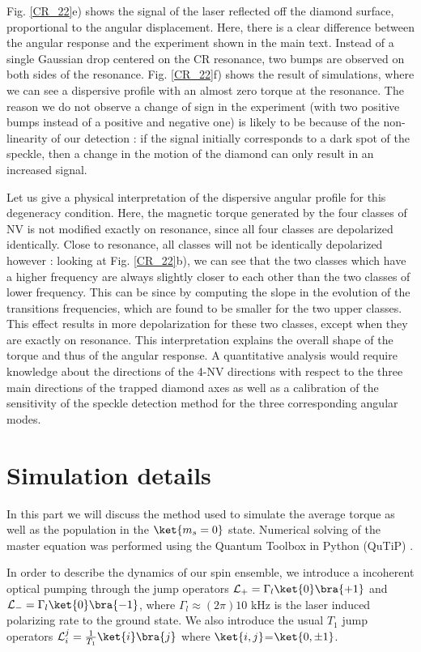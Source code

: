 \documentclass[preprintnumbers,amsmath,amssymb,onecolumn,12pt]{revtex4}
\begin{document}
Fig. \ref{CR_22}e) shows the signal of the laser reflected off the diamond surface, proportional to the angular displacement. Here, there is a clear difference between the angular response and the experiment shown in the main text. Instead of a single Gaussian drop centered on the CR resonance, two bumps are observed on both sides of the resonance. 
Fig. \ref{CR_22}f) shows the result of simulations, where we can see a dispersive profile with an almost zero torque at the resonance. 
The reason we do not observe a change of sign in the experiment (with two positive bumps instead of a positive and negative one) is likely to be because of the non-linearity of our detection : if the signal initially corresponds to a dark spot of the speckle, then a change in the motion of the diamond can only result in an increased signal. 

Let us give a physical interpretation of the dispersive angular profile for this degeneracy condition. 
Here, the magnetic torque generated by the four classes of NV is not modified exactly on resonance, since all four classes are depolarized identically. Close to resonance, all classes will not be identically depolarized however : looking at Fig. \ref{CR_22}b), we can see that the two classes which have a higher frequency are always slightly closer to each other than the two classes of lower frequency. This can be since by computing the slope in the evolution of the transitions frequencies, which are found to be smaller for the two upper classes. 
This effect results in more depolarization for these two classes, except when they are exactly on resonance. This interpretation explains the overall shape of the torque and thus of the angular response.
A quantitative analysis would require knowledge about the directions of the 4-NV directions with respect to the three main directions of the trapped diamond axes as well as a calibration of the sensitivity of the speckle detection method for the three corresponding angular modes. 

\section{Simulation details}
\label{Simu}
In this part we will discuss the method used to simulate the average torque as well as the population in the $\ket{m_s=0}$ state. Numerical solving of the master equation was performed using the Quantum Toolbox in Python (QuTiP) \citep{qutip1} \citep{qutip2}.

In order to describe the dynamics of our spin ensemble, we introduce a incoherent optical pumping through the jump operators $\mathcal{L}_+ = \Gamma_l \ket{0}\bra{+1} $ and $\mathcal{L}_- = \Gamma_l \ket{0}\bra{-1} $, where $\Gamma_l \approx (2\pi) 10$ kHz is the laser induced polarizing rate to the ground state.
We also introduce the usual $T_1$ jump operators $\mathcal{L}_i^j= \frac{1}{T_1}\ket{i}\bra{j}$ where $\ket{i,j}$=$\ket{0, \pm 1}$.
\end{document}
